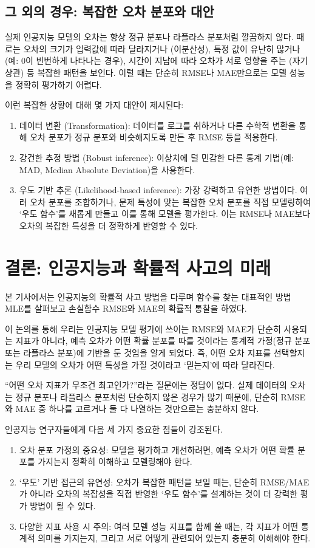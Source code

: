 \documentclass{article}
\begin{document}
\subsection{그 외의 경우: 복잡한 오차 분포와 대안}
\label{subsec:other}
실제 인공지능 모델의 오차는 항상 정규 분포나 라플라스 분포처럼 깔끔하지 않다. 때로는 오차의 크기가 입력값에 따라 달라지거나 (이분산성), 특정 값이 유난히 많거나 (예: 0이 빈번하게 나타나는 경우), 시간이 지남에 따라 오차가 서로 영향을 주는 (자기 상관) 등 복잡한 패턴을 보인다. 이럴 때는 단순히 RMSE나 MAE만으로는 모델 성능을 정확히 평가하기 어렵다.

이런 복잡한 상황에 대해 몇 가지 대안이 제시된다:
\begin{enumerate}
  \item 데이터 변환 (Transformation): 데이터를 로그를 취하거나 다른 수학적 변환을 통해 오차 분포가 정규 분포와 비슷해지도록 만든 후 RMSE 등을 적용한다.
  \item 강건한 추정 방법 (Robust inference): 이상치에 덜 민감한 다른 통계 기법(예: MAD, Median Absolute Deviation)을 사용한다.
  \item 우도 기반 추론 (Likelihood-based inference): 가장 강력하고 유연한 방법이다. 여러 오차 분포를 조합하거나, 문제 특성에 맞는 복잡한 오차 분포를 직접 모델링하여 `우도 함수'를 새롭게 만들고 이를 통해 모델을 평가한다. 이는 RMSE나 MAE보다 오차의 복잡한 특성을 더 정확하게 반영할 수 있다.
\end{enumerate}

\section{결론: 인공지능과 확률적 사고의 미래}
\label{sec:result}
본 기사에서는 인공지능의 확률적 사고 방법을 다루며 함수를 찾는 대표적인 방법 MLE를 살펴보고 손실함수 RMSE와 MAE의 확률적 통찰을 하였다.

이 논의를 통해 우리는 인공지능 모델 평가에 쓰이는 RMSE와 MAE가 단순히 사용되는 지표가 아니라, 예측 오차가 어떤 확률 분포를 따를 것이라는 통계적 가정(정규 분포 또는 라플라스 분포)에 기반을 둔 것임을 알게 되었다. 즉, 어떤 오차 지표를 선택할지는 우리 모델의 오차가 어떤 특성을 가질 것이라고 `믿는지'에 따라 달라진다.

``어떤 오차 지표가 무조건 최고인가?''라는 질문에는 정답이 없다. 실제 데이터의 오차는 정규 분포나 라플라스 분포처럼 단순하지 않은 경우가 많기 때문에, 단순히 RMSE와 MAE 중 하나를 고르거나 둘 다 나열하는 것만으로는 충분하지 않다.

인공지능 연구자들에게 다음 세 가지 중요한 점들이 강조된다.
\begin{enumerate}
  \item 오차 분포 가정의 중요성: 모델을 평가하고 개선하려면, 예측 오차가 어떤 확률 분포를 가지는지 정확히 이해하고 모델링해야 한다.
  \item `우도' 기반 접근의 유연성: 오차가 복잡한 패턴을 보일 때는, 단순히 RMSE/MAE가 아니라 오차의 복잡성을 직접 반영한 `우도 함수'를 설계하는 것이 더 강력한 평가 방법이 될 수 있다.
  \item 다양한 지표 사용 시 주의: 여러 모델 성능 지표를 함께 쓸 때는, 각 지표가 어떤 통계적 의미를 가지는지, 그리고 서로 어떻게 관련되어 있는지 충분히 이해해야 한다.
\end{enumerate}
\end{document}
